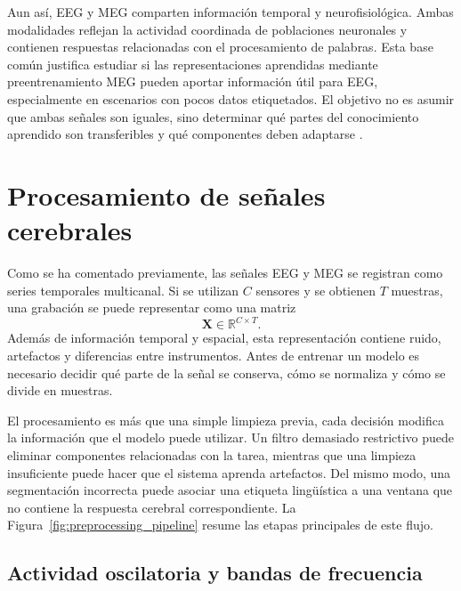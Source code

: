 Aun así, EEG y MEG comparten información temporal y neurofisiológica. Ambas modalidades reflejan la actividad coordinada de poblaciones neuronales y contienen respuestas relacionadas con el procesamiento de palabras. Esta base común justifica estudiar si las representaciones aprendidas mediante preentrenamiento MEG pueden aportar información útil para EEG, especialmente en escenarios con pocos datos etiquetados. El objetivo no es asumir que ambas señales son iguales, sino determinar qué partes del conocimiento aprendido son transferibles y qué componentes deben adaptarse \cite{pan2010transfer,xiao2025brainomni}.

\section{Procesamiento de señales cerebrales}

Como se ha comentado previamente, las señales EEG y MEG se registran como series temporales multicanal. Si se utilizan \(C\) sensores y se obtienen \(T\) muestras, una grabación se puede representar como una matriz
\[
    \mathbf{X} \in \mathbb{R}^{C \times T}.
\]
Además de información temporal y espacial, esta representación contiene ruido, artefactos y diferencias entre instrumentos. Antes de entrenar un modelo es necesario decidir qué parte de la señal se conserva, cómo se normaliza y cómo se divide en muestras.

El procesamiento es más que una simple limpieza previa, cada decisión modifica la información que el modelo puede utilizar. Un filtro demasiado restrictivo puede eliminar componentes relacionadas con la tarea, mientras que una limpieza insuficiente puede hacer que el sistema aprenda artefactos. Del mismo modo, una segmentación incorrecta puede asociar una etiqueta lingüística a una ventana que no contiene la respuesta cerebral correspondiente. La Figura~\ref{fig:preprocessing_pipeline} resume las etapas principales de este flujo.



\subsection{Actividad oscilatoria y bandas de frecuencia}

